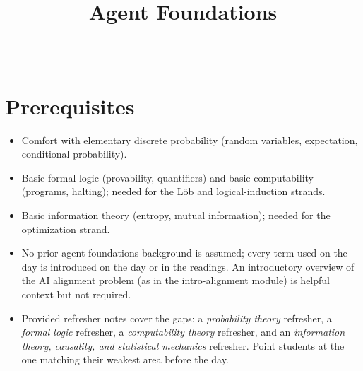 \documentclass[11pt]{article}
\title{Agent Foundations}
\author{
  \authorname{Daniel C}
  \and
  \authorname{Satya Benson}\\
  \affiliation{Williams College}
}
\begin{document}
\maketitle

\section{Prerequisites}
\begin{itemize}
\item
  Comfort with elementary discrete probability (random variables, expectation, conditional probability).
\item
  Basic formal logic (provability, quantifiers) and basic computability (programs, halting); needed for the Löb and logical-induction strands.
\item
  Basic information theory (entropy, mutual information); needed for the optimization strand.
\item
  No prior agent-foundations background is assumed; every term used on the day is introduced on the day or in the readings. An introductory overview of the AI alignment problem (as in the intro-alignment module) is helpful context but not required.
\item
  Provided refresher notes cover the gaps: a \emph{probability theory} refresher, a \emph{formal logic} refresher, a \emph{computability theory} refresher, and an \emph{information theory, causality, and statistical mechanics} refresher. Point students at the one matching their weakest area before the day.
\end{itemize}
\end{document}
